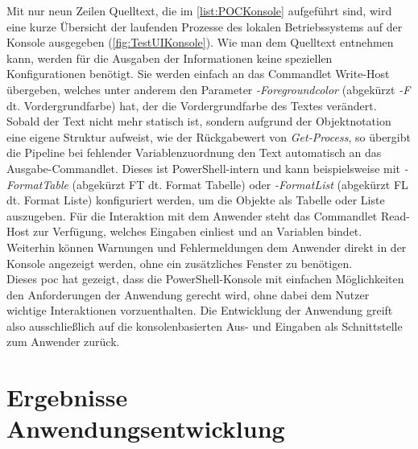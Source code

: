 Mit nur neun Zeilen Quelltext, die im \autoref{list:POCKonsole} aufgeführt sind, wird eine kurze Übersicht der laufenden Prozesse des lokalen Betriebssystems auf der Konsole ausgegeben (\autoref{fig:TestUIKonsole}). Wie man dem Quelltext entnehmen kann, werden für die Ausgaben der Informationen keine speziellen Konfigurationen benötigt. Sie werden einfach an das Commandlet Write-Host übergeben, welches unter anderem den Parameter \textit{-Foregroundcolor} (abgekürzt \textit{-F} dt. Vordergrundfarbe) hat, der die Vordergrundfarbe des Textes verändert. Sobald der Text nicht mehr statisch ist, sondern aufgrund der Objektnotation eine eigene Struktur aufweist, wie der Rückgabewert von \textit{Get-Process}, so übergibt die Pipeline bei fehlender Variablenzuordnung den Text automatisch an das Ausgabe-Commandlet. Dieses ist PowerShell-intern und kann beispielsweise mit \textit{-FormatTable} (abgekürzt FT dt. Format Tabelle) oder \textit{-FormatList} (abgekürzt FL dt. Format Liste) konfiguriert werden, um die Objekte als Tabelle oder Liste auszugeben. Für die Interaktion mit dem Anwender steht das Commandlet Read-Host zur Verfügung, welches Eingaben einliest und an Variablen bindet. Weiterhin können Warnungen und Fehlermeldungen dem Anwender direkt in der Konsole angezeigt werden, ohne ein zusätzliches Fenster zu benötigen.\medskip\\Dieses \acrlong{poc} hat gezeigt, dass die PowerShell-Konsole mit einfachen Möglichkeiten den Anforderungen der Anwendung gerecht wird, ohne dabei dem Nutzer wichtige Interaktionen vorzuenthalten. Die Entwicklung der Anwendung greift also ausschließlich auf die konsolenbasierten Aus- und Eingaben als Schnittstelle zum Anwender zurück.

\newpage

\chapter{Ergebnisse Anwendungsentwicklung}
\begin{comment}
\section{Was wurde erreicht?}
\begin{enumerate}[noitemsep,topsep=0pt,parsep=0pt,partopsep=0pt]
    \item Toolkit als Zusammenfassung mehrerer Skripte
    \item Systemabfrage mit Generieren von Berichten als zentrales Bestandteil
    \item Prozessmonitor
    \item Bestätigen von Windows Updates
\end{enumerate}
\end{comment}
